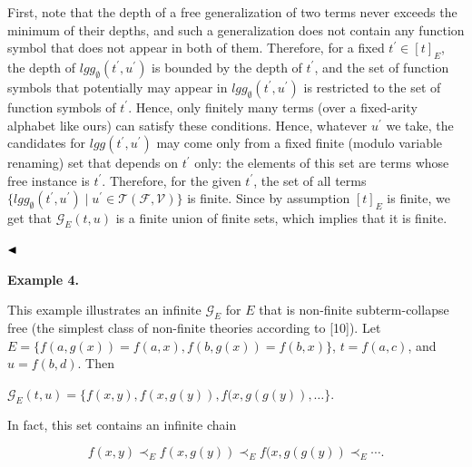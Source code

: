 \documentclass[10pt,a4paper]{amsart}
\begin{document}
First, note that the depth of a free generalization of two terms never exceeds the minimum of their depths, and such a generalization does not contain any function symbol that does not appear in both of them. Therefore, for a fixed $t^{\prime}\in[t]_{E}$, the depth of $\mathit{lgg}_{\emptyset}(t^{\prime},u^{\prime})$ is bounded by the depth of $t^{\prime}$, and the set of function symbols that potentially may appear in $\mathit{lgg}_{\emptyset}(t^{\prime},u^{\prime})$ is restricted to the set of function symbols of $t^{\prime}$. Hence, only finitely many terms (over a fixed-arity alphabet like ours) can satisfy these conditions. Hence, whatever $u^{\prime}$ we take, the candidates for $\mathit{lgg}(t^{\prime},u^{\prime})$ may come only from a fixed finite (modulo variable renaming) set that depends on $t^{\prime}$ only: the elements of this set are terms whose free instance is $t^{\prime}$. Therefore, for the given $t^{\prime}$, the set of all terms $\{\mathit{lgg}_{\emptyset}(t^{\prime},u^{\prime})\mid u^{\prime}\in\mathcal{T}(\mathcal{F},\mathcal{V})\}$ is finite. Since by assumption $[t]_{E}$ is finite, we get that $\mathcal{G}_{E}(t,u)$ is a finite union of finite sets, which implies that it is finite.\par
 
 
  
$\hfill\blacktriangleleft$\par
 
 
 
\par\medskip\noindent\textbf{Example 4.}\par
 
 
This example illustrates an infinite $\mathcal{G}_{E}$ for $E$ that is non-finite subterm-collapse free (the simplest class of non-finite theories according to [10]). Let $E=\{f(a,g(x))=f(a,x),f(b,g(x))=f(b,x)\}$, $t=f(a,c)$, and $u=f(b,d)$. Then\par
  
\par  \quad  $\displaystyle\mathcal{G}_{E}(t,u)=\{f(x,y),f(x,g(y)),f(x,g(g(y)),\ldots\}.$\quad  \quad  
  
In fact, this set contains an infinite chain\par
  
\par  \quad  \[f(x,y)\prec_{E}f(x,g(y))\prec_{E}f(x,g(g(y))\prec_{E}\cdots.\]\quad  \quad  
  
\end{document}
